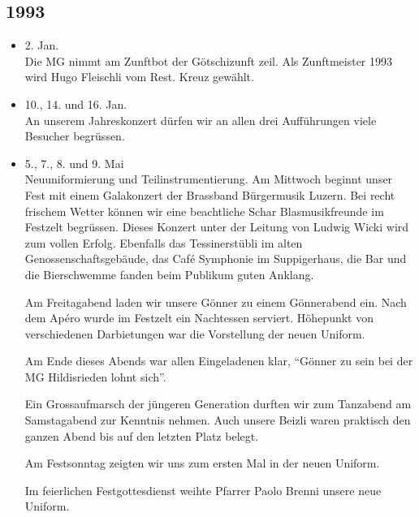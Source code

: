 \subsection*{1993}

\begin{history}


    \begin{itemize}

        \item 2. Jan.\\
              Die MG nimmt am Zunftbot der Götschizunft zeil. Als Zunftmeister 1993
              wird Hugo Fleischli vom Rest. Kreuz gewählt.

        \item 10., 14. und 16. Jan.\\
              An unserem Jahreskonzert dürfen wir an allen drei Aufführungen viele
              Besucher begrüssen.

        \item 5., 7., 8. und 9. Mai\\
              Neuuniformierung und Teilinstrumentierung. Am Mittwoch beginnt unser
              Fest mit einem Galakonzert der Brassband Bürgermusik Luzern. Bei recht
              frischem Wetter können wir eine beachtliche Schar Blasmusikfreunde im
              Festzelt begrüssen. Dieses Konzert unter der Leitung von Ludwig Wicki
              wird zum vollen Erfolg. Ebenfalls das Tessinerstübli im alten
              Genossenschaftsgebäude, das Café Symphonie im Suppigerhaus, die Bar und
              die Bierschwemme fanden beim Publikum guten Anklang.

              Am Freitagabend laden wir unsere Gönner zu einem Gönnerabend ein. Nach
              dem Apéro wurde im Festzelt ein Nachtessen serviert. Höhepunkt von
              verschiedenen Darbietungen war die Vorstellung der neuen Uniform.

              Am Ende dieses Abends war allen Eingeladenen klar, \enquote{Gönner zu sein
                  bei der MG Hildisrieden lohnt sich}.

              Ein Grossaufmarsch der jüngeren Generation durften wir zum Tanzabend am
              Samstagabend zur Kenntnis nehmen. Auch unsere Beizli waren praktisch den
              ganzen Abend bis auf den letzten Platz belegt.

              Am Festsonntag zeigten wir uns zum ersten Mal in der neuen Uniform.

              Im feierlichen Festgottesdienst weihte Pfarrer Paolo Brenni unsere neue Uniform.


\end{itemize}
\end{history}
